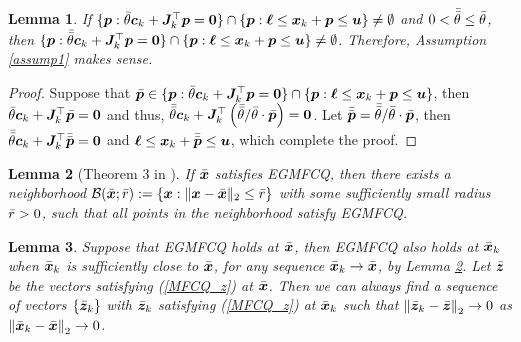 \documentclass[aos]{imsart}
\numberwithin{equation}{section}
\theoremstyle{plain}
\newtheorem{lemma}{Lemma}
\begin{document}
\begin{appendix}
\begin{lemma}
\label{prop_reason}
    If $\{\bm{p}: \Bar{\theta} \bm{c}_k +  \bm{J}_k^{\top} \bm{p} = \bm{0}\} \cap \{\bm{p}: \bm{\ell} \leq \bm{x}_k + \bm{p} \leq \bm{u}\} \neq \emptyset$ and $0<\Bar{\Bar{\theta}} \leq \Bar{\theta}$, then $\{\bm{p}: \Bar{\Bar{\theta}} \bm{c}_k +  \bm{J}_k^{\top} \bm{p} = \bm{0}\} \cap \{\bm{p}: \bm{\ell} \leq \bm{x}_k + \bm{p} \leq \bm{u}\} \neq \emptyset$. Therefore, Assumption \ref{assump1} makes sense. 
\end{lemma}


\begin{proof}
    Suppose that $\Bar{\bm{p}} \in \{\bm{p}: \Bar{\theta} \bm{c}_k +  \bm{J}_k^{\top} \bm{p} = \bm{0}\} \cap \{\bm{p}: \bm{\ell} \leq \bm{x}_k + \bm{p} \leq \bm{u}\}$, then $\Bar{\theta} \bm{c}_k +  \bm{J}_k^{\top} \Bar{\bm{p}}  = \bm{0}$ and thus, $\Bar{\Bar{\theta}} \bm{c}_k +  \bm{J}_k^{\top} \left(\Bar{\Bar{\theta}} /\Bar{\theta} \cdot \Bar{\bm{p}}\right)  = \bm{0}$. Let $\Bar{\Bar{\bm{p}}} = \Bar{\Bar{\theta}} /\Bar{\theta} \cdot \Bar{\bm{p}}$, then $\Bar{\Bar{\theta}} \bm{c}_k +  \bm{J}_k^{\top} \Bar{\Bar{\bm{p}}}  = \bm{0}$ and $\bm{\ell} \leq \bm{x}_k + \Bar{\Bar{\bm{p}}} \leq \bm{u}$, which complete the proof.
\end{proof}


\begin{lemma}
[Theorem 3 in \cite{robinson1976stability}]
\label{prop_MFCQ_neighborhood}
    If $\Bar{\bm{x}}$ satisfies EGMFCQ, then there exists a neighborhood $\mathcal{B}(\Bar{\bm{x}};\Bar{r}):= \{\bm{x}: \|\bm{x}- \Bar{\bm{x}}\|_2 \leq \Bar{r}\}$ with some sufficiently small radius $\Bar{r}>0$, such that all points in the neighborhood satisfy EGMFCQ. 
\end{lemma}


\begin{lemma}
\label{prop_continuity_z}
    Suppose that EGMFCQ holds at $\Bar{\bm{x}}$, then EGMFCQ also holds at $\Bar{\bm{x}}_{k}$ when $\Bar{\bm{x}}_{k}$ is sufficiently close to $\Bar{\bm{x}}$, for any sequence $\Bar{\bm{x}}_{k} \to \Bar{\bm{x}}$, by Lemma \ref{prop_MFCQ_neighborhood}. Let $\Bar{\bm{z}}$ be the vectors satisfying (\ref{MFCQ_z}) at $\Bar{\bm{x}}$. Then we can always find a sequence of vectors $\{\Bar{\bm{z}}_{k}\}$ with $\Bar{\bm{z}}_{k}$ satisfying (\ref{MFCQ_z}) at $\Bar{\bm{x}}_{k}$ such that
    $\left\| \Bar{\bm{z}}_{k} - \Bar{\bm{z}} \right\|_2 \to 0$ as $\left\| \Bar{\bm{x}}_{k} - \Bar{\bm{x}} \right\|_2 \to 0$. 
\end{lemma}



\end{appendix}
\end{document}
